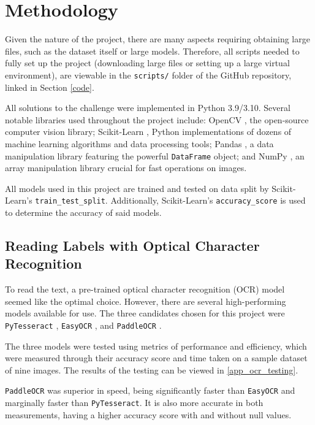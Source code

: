 \documentclass[final,5p,times,twocolumn,authoryear]{elsarticle}
\begin{document}
\section{Methodology}
\label{method}

Given the nature of the project, there are many aspects requiring obtaining large files, such as the dataset itself or large models. Therefore, all scripts needed to fully set up the project (downloading large files or setting up a large virtual environment), are viewable in the \verb|scripts/| folder of the GitHub repository, linked in Section \ref{code}.

All solutions to the challenge were implemented in Python 3.9/3.10. Several notable libraries used throughout the project include: OpenCV \citep{opencv_library}, the open-source computer vision library; Scikit-Learn \citep{scikit-learn}, Python implementations of dozens of machine learning algorithms and data processing tools; Pandas \citep{mckinney2010data}, a data manipulation library featuring the powerful \verb|DataFrame| object; and NumPy \citep{harris2020array}, an array manipulation library crucial for fast operations on images.

All models used in this project are trained and tested on data split by Scikit-Learn's \verb|train_test_split|. Additionally, Scikit-Learn's \verb|accuracy_score| is used to determine the accuracy of said models.

\subsection{Reading Labels with Optical Character Recognition}
\label{step_1}

To read the text, a pre-trained optical character recognition (OCR) model seemed like the optimal choice. However, there are several high-performing models available for use. The three candidates chosen for this project were \verb|PyTesseract| \citep{lee2017pytesseract}, \verb|EasyOCR| \citep{jaided2020easyocr}, and \verb|PaddleOCR| \citep{du2020ppocr}.

The three models were tested using metrics of performance and efficiency, which were measured through their accuracy score and time taken on a sample dataset of nine images. The results of the testing can be viewed in \ref{app_ocr_testing}.

\verb|PaddleOCR| was superior in speed, being significantly faster than \verb|EasyOCR| and marginally faster than \verb|PyTesseract|. It is also more accurate in both measurements, having a higher accuracy score with and without null values.
\end{document}
